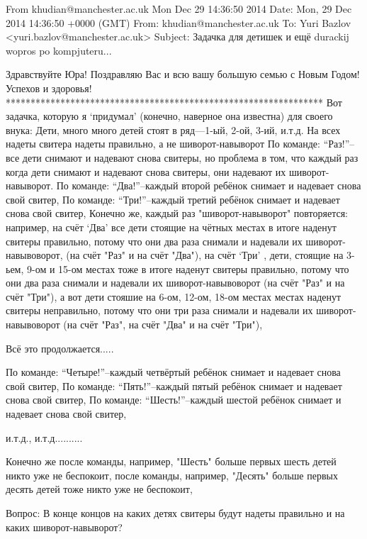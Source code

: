 From khudian@manchester.ac.uk Mon Dec 29 14:36:50 2014
Date: Mon, 29 Dec 2014 14:36:50 +0000 (GMT)
From: khudian@manchester.ac.uk
To: Yuri Bazlov <yuri.bazlov@manchester.ac.uk>
Subject: Задачка для детишек и ещё durackij wopros po kompjuteru...


            Здравствуйте Юра!
   Поздравляю Вас и всю вашу большую семью с Новым Годом!
        Успехов и здоровья!
****************************************************************
   Вот задачка, которую я `придумал' (конечно, наверное она известна)
   для своего внука:
     Дети, много много детей стоят в ряд---1-ый, 2-ой, 3-ий, и.т.д.
  На всех надеты свитера надеты правильно, а не шиворот-навыворот
   По команде: ``Раз!''--все дети снимают и надевают снова свитеры,
  но проблема в том, что каждый раз когда дети снимают
   и надевают снова свитеры, они надевают их шиворот-навыворот.
   По команде: ``Два!''--каждый второй ребёнок снимает
                         и надевает снова свой свитер,
   По команде: ``Три!''--каждый третий  ребёнок снимает
                         и надевает снова свой свитер,
   Конечно же, каждый раз "шиворот-навыворот" повторяется:
           например, на счёт  `Два' все дети стоящие на чётных
   местах в итоге наденут свитеры правильно, потому что они два раза
снимали и надевали их шиворот-навывоворот, (на счёт "Раз" и на счёт "Два"),
  на счёт `Три' , дети, стоящие на 3-ьем, 9-ом и 15-ом местах
   тоже в итоге наденут свитеры правильно, потому что они два раза
снимали и надевали их шиворот-навывоворот (на счёт "Раз" и на счёт "Три"),
    а вот дети стояшие на 6-ом, 12-ом, 18-ом местах
    местах наденут свитеры неправильно, потому что они три раза
    снимали и надевали их шиворот-навывоворот (на счёт "Раз", на счёт "Два"
      и  на счёт "Три"),

    Всё это продолжается.....

   По команде: ``Четыре!''--каждый четвёртый  ребёнок снимает
                         и надевает снова свой свитер,
   По команде: ``Пять!''--каждый пятый  ребёнок снимает
                         и надевает снова свой свитер,
   По команде: ``Шесть!''--каждый шестой  ребёнок снимает
                         и надевает снова свой свитер,

   и.т.д., и.т.д..........

   Конечно же после команды, например, "Шесть" больше первых
           шесть детей никто уже не беспокоит,
после команды, например, "Десять" больше первых
десять  детей тоже никто уже  не беспокоит,


    Вопрос:  В конце концов на каких детях
    свитеры будут надеты правильно и на каких
     шиворот-навыворот?

